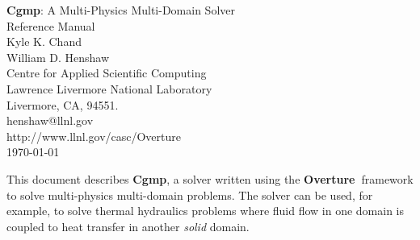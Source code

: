 \documentclass[11pt]{article}
\newcommand{\Overture}{{\bf Over\-ture\ }}
\begin{document}


\def\comma  {~~~,~~}
\newcommand{\uvd}{\mathbf{U}}
\def\ud     {{    U}}
\def\pd     {{    P}}
\def\calo{{\cal O}}

\newcommand{\mbar}{\bar{m}}
\newcommand{\Rbar}{\bar{R}}
\newcommand{\Ru}{R_u}         %
\newcommand{\Div}{\grad\cdot}
\newcommand{\tauv}{\boldsymbol{\tau}}
\newcommand{\thetav}{\boldsymbol{\theta}}

\newcommand{\Omegav}{\boldsymbol{\Omega}}
\newcommand{\omegav}{\boldsymbol{\omega}}
\newcommand{\sigmav}{\boldsymbol{\sigma}}
\newcommand{\cm}{{\rm cm}}
\newcommand{\Jc}{{\mathcal J}}

\newcommand{\sumi}{\sum_{i=1}^n}
\newcommand{\dt}{{\Delta t}}

\def\ff {\tt} %



\newcommand{\bogus}[1]{}  %

\vspace{5\baselineskip}
\begin{flushleft}
{\Large
{\bf Cgmp}: A Multi-Physics Multi-Domain Solver \\
    Reference Manual \\
}
\vspace{2\baselineskip}
Kyle K. Chand  \\
William D. Henshaw  \\
Centre for Applied Scientific Computing  \\
Lawrence Livermore National Laboratory      \\
Livermore, CA, 94551.  \\
henshaw@llnl.gov \\
http://www.llnl.gov/casc/Overture\\
\vspace{\baselineskip}
\today\\
\vspace{\baselineskip}

\vspace{4\baselineskip}


This document describes {\bf Cgmp}, a solver written using the \Overture framework
to solve multi-physics multi-domain problems. The solver can be used, for example,
to solve thermal hydraulics problems where fluid flow in one domain is coupled to heat transfer
in another {\em solid} domain.

\end{flushleft}
\end{document}
